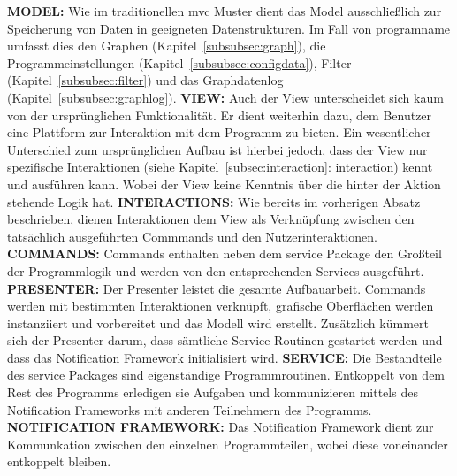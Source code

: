 \textbf{MODEL:}\newline
Wie im traditionellen \gls{mvc} Muster dient das Model ausschließlich zur Speicherung von Daten in geeigneten Datenstrukturen. Im Fall von \gls{programname} umfasst dies den Graphen (Kapitel~\ref{subsubsec:graph}), die Programmeinstellungen (Kapitel~\ref{subsubsec:configdata}), Filter (Kapitel~\ref{subsubsec:filter}) und das Graphdatenlog (Kapitel~\ref{subsubsec:graphlog}). \newline
 \newline
\textbf{VIEW:}\newline
Auch der View unterscheidet sich kaum von der ursprünglichen Funktionalität. Er dient weiterhin dazu, dem Benutzer eine Plattform zur Interaktion mit dem Programm zu bieten. Ein wesentlicher Unterschied zum ursprünglichen Aufbau ist hierbei jedoch, dass der View nur spezifische Interaktionen (siehe Kapitel~\ref{subsec:interaction}: interaction) kennt und ausführen kann. Wobei der View keine Kenntnis über die hinter der Aktion stehende Logik hat. \newline
 \newline
\textbf{INTERACTIONS:}\newline
Wie bereits im vorherigen Absatz beschrieben, dienen Interaktionen dem View als Verknüpfung zwischen den tatsächlich ausgeführten Commmands und den Nutzerinteraktionen.\newline
 \newline
\textbf{COMMANDS:}\newline
Commands enthalten neben dem service Package den Großteil der Programmlogik und werden von den entsprechenden Services ausgeführt.\newline
 \newline
\textbf{PRESENTER:}\newline
Der Presenter leistet die gesamte Aufbauarbeit. Commands werden mit bestimmten Interaktionen verknüpft, grafische Oberflächen werden instanziiert und vorbereitet und das Modell wird erstellt.
Zusätzlich kümmert sich der Presenter darum, dass sämtliche Service Routinen gestartet werden und dass das Notification Framework initialisiert wird.\newline
 \newline
\textbf{SERVICE:}\newline
Die Bestandteile des service Packages sind eigenständige Programmroutinen. Entkoppelt von dem Rest des Programms erledigen sie Aufgaben und kommunizieren mittels des Notification Frameworks mit anderen Teilnehmern des Programms.\newline
 \newline
\textbf{NOTIFICATION FRAMEWORK:}\newline
Das Notification Framework dient zur Kommunkation zwischen den einzelnen Programmteilen, wobei diese voneinander entkoppelt bleiben.

